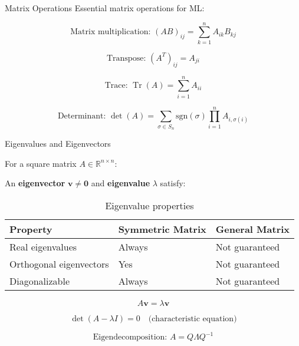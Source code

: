 \documentclass[11pt,16:9]{beamer}
\DeclareMathOperator{\Tr}{Tr}
\begin{document}
\begin{frame}{Matrix Operations}
Essential matrix operations for ML:

\begin{equation}
\text{Matrix multiplication: } (AB)_{ij} = \sum_{k=1}^{n} A_{ik}B_{kj}
\end{equation}

\begin{equation}
\text{Transpose: } (A^T)_{ij} = A_{ji}
\end{equation}

\begin{equation}
\text{Trace: } \Tr(A) = \sum_{i=1}^{n} A_{ii}
\end{equation}

\begin{equation}
\text{Determinant: } \det(A) = \sum_{\sigma \in S_n} \text{sgn}(\sigma) \prod_{i=1}^{n} A_{i,\sigma(i)}
\end{equation}

\end{frame}



\begin{frame}{Eigenvalues and Eigenvectors}

            For a square matrix $A \in \mathbb{R}^{n \times n}$:
            
            An \textbf{eigenvector} $\mathbf{v} \neq \mathbf{0}$ and \textbf{eigenvalue} $\lambda$ satisfy:
            


\begin{table}[center]
    \centering
    \caption{Eigenvalue properties}
    \begin{tabular}{lll}
    \toprule
        Property & Symmetric Matrix & General Matrix \\
        \midrule
        Real eigenvalues & Always & Not guaranteed \\
        Orthogonal eigenvectors & Yes & Not guaranteed \\
        Diagonalizable & Always & Not guaranteed \\
        \bottomrule
    \end{tabular}
    
    
\end{table}


\begin{equation}
A\mathbf{v} = \lambda\mathbf{v}
\end{equation}

\begin{equation}
\det(A - \lambda I) = 0 \quad \text{(characteristic equation)}
\end{equation}

\begin{equation}
\text{Eigendecomposition: } A = Q\Lambda Q^{-1}
\end{equation}

\end{frame}


\end{document}
